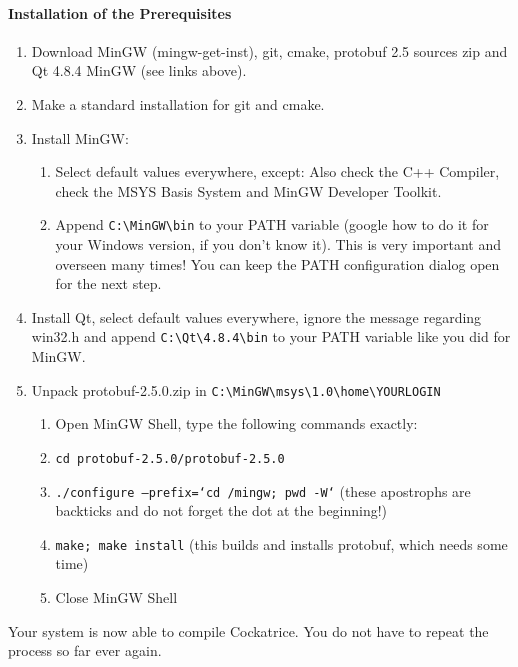 \documentclass[a4paper]{scrbook}
\newcommand{\shellcmd}[1]{\texttt{\scriptsize #1}}
\begin{document}
\paragraph{Installation of the Prerequisites}
\begin{enumerate}
 \item Download MinGW (mingw-get-inst), git, cmake, protobuf 2.5 sources zip and Qt 4.8.4 MinGW (see links above).
 \item Make a standard installation for git and cmake.
 \item Install MinGW:
    \begin{enumerate}
      \item Select default values everywhere, except: Also check the C++ Compiler, check the MSYS Basis System and MinGW Developer Toolkit.
      \item Append \shellcmd{C:\textbackslash MinGW\textbackslash bin} to your PATH variable (google how to do it for your Windows version, if you don't know it).
      This is very important and overseen many times! You can keep the PATH configuration dialog open for the next step.
    \end{enumerate}
 \item Install Qt, select default values everywhere, ignore the message regarding win32.h and append \shellcmd{C:\textbackslash Qt\textbackslash 4.8.4\textbackslash bin} to your PATH variable like you did for MinGW.
 \item Unpack protobuf-2.5.0.zip in \shellcmd{C:\textbackslash MinGW\textbackslash msys\textbackslash 1.0\textbackslash home\textbackslash YOURLOGIN}
    \begin{enumerate}
     \item Open MinGW Shell, type the following commands exactly:
     \item \shellcmd{cd protobuf-2.5.0/protobuf-2.5.0}
     \item \shellcmd{./configure --prefix=`cd /mingw; pwd -W`} (these apostrophs are backticks and do not forget the dot at the beginning!)
     \item \shellcmd{make; make install} (this builds and installs protobuf, which needs some time)
     \item Close MinGW Shell
    \end{enumerate}
\end{enumerate}
Your system is now able to compile Cockatrice. You do not have to repeat the process so far ever again.
\end{document}
